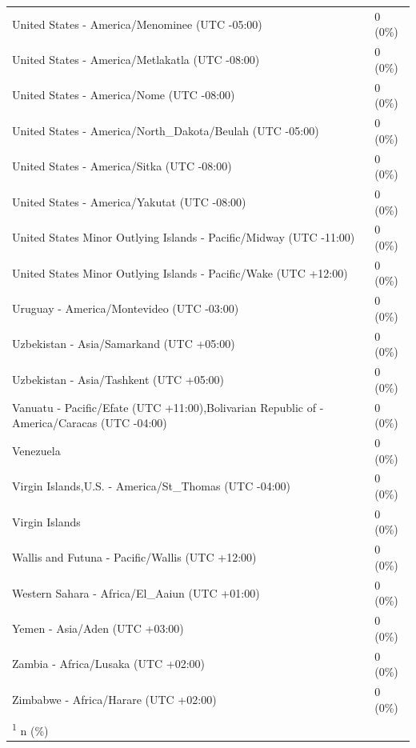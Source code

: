 \begin{appendix}
\begin{table}
{\begin{tabular}[t]{ll}
\hspace{1em}United States - America/Menominee (UTC -05:00) & 0 (0\%)\\
\hspace{1em}United States - America/Metlakatla (UTC -08:00) & 0 (0\%)\\
\hspace{1em}United States - America/Nome (UTC -08:00) & 0 (0\%)\\
\hspace{1em}United States - America/North\_Dakota/Beulah (UTC -05:00) & 0 (0\%)\\
\addlinespace
\hspace{1em}United States - America/Sitka (UTC -08:00) & 0 (0\%)\\
\hspace{1em}United States - America/Yakutat (UTC -08:00) & 0 (0\%)\\
\hspace{1em}United States Minor Outlying Islands - Pacific/Midway (UTC -11:00) & 0 (0\%)\\
\hspace{1em}United States Minor Outlying Islands - Pacific/Wake (UTC +12:00) & 0 (0\%)\\
\hspace{1em}Uruguay - America/Montevideo (UTC -03:00) & 0 (0\%)\\
\addlinespace
\hspace{1em}Uzbekistan - Asia/Samarkand (UTC +05:00) & 0 (0\%)\\
\hspace{1em}Uzbekistan - Asia/Tashkent (UTC +05:00) & 0 (0\%)\\
\hspace{1em}Vanuatu - Pacific/Efate (UTC +11:00),Bolivarian Republic of - America/Caracas (UTC -04:00) & 0 (0\%)\\
\hspace{1em}Venezuela & 0 (0\%)\\
\hspace{1em}Virgin Islands,U.S. - America/St\_Thomas (UTC -04:00) & 0 (0\%)\\
\addlinespace
\hspace{1em}Virgin Islands & 0 (0\%)\\
\hspace{1em}Wallis and Futuna - Pacific/Wallis (UTC +12:00) & 0 (0\%)\\
\hspace{1em}Western Sahara - Africa/El\_Aaiun (UTC +01:00) & 0 (0\%)\\
\hspace{1em}Yemen - Asia/Aden (UTC +03:00) & 0 (0\%)\\
\hspace{1em}Zambia - Africa/Lusaka (UTC +02:00) & 0 (0\%)\\
\addlinespace
\hspace{1em}Zimbabwe - Africa/Harare (UTC +02:00) & 0 (0\%)\\
\bottomrule
\multicolumn{2}{l}{\rule{0pt}{1em}\textsuperscript{1} n (\%)}\\
\end{tabular}}
\end{table}
\end{appendix}
